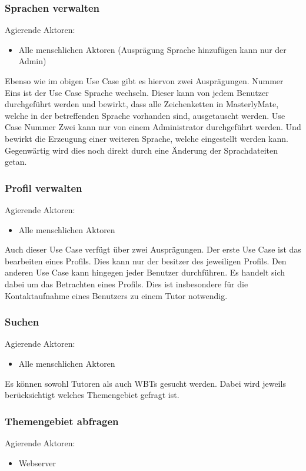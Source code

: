 \subsubsection{Sprachen verwalten}
Agierende Aktoren: \begin{itemize}
  \item Alle menschlichen Aktoren (Ausprägung Sprache
hinzufügen kann nur der Admin)
\end{itemize}

Ebenso wie im obigen Use Case gibt es hiervon zwei Ausprägungen.
Nummer Eins ist der Use Case Sprache wechseln. Dieser kann von jedem Benutzer
durchgeführt werden und bewirkt, dass alle Zeichenketten in MasterlyMate, welche
in der betreffenden Sprache vorhanden sind, ausgetauscht werden. Use Case Nummer
Zwei kann nur von einem Administrator durchgeführt werden. Und bewirkt die
Erzeugung einer weiteren Sprache, welche eingestellt werden kann. Gegenwärtig
wird dies noch direkt durch eine Änderung der Sprachdateiten getan.
\newpage
\subsubsection{Profil verwalten}
Agierende Aktoren: \begin{itemize}
  \item Alle menschlichen Aktoren
\end{itemize}

Auch dieser Use Case verfügt über zwei Ausprägungen. Der erste Use Case ist das
bearbeiten eines Profils. Dies kann nur der besitzer des jeweiligen Profils.
Den anderen Use Case kann hingegen jeder Benutzer durchführen. Es handelt sich
dabei um das Betrachten eines Profils. Dies ist insbesondere für die
Kontaktaufnahme eines Benutzers zu einem Tutor notwendig.

\subsubsection{Suchen}
Agierende Aktoren: \begin{itemize}
  \item Alle menschlichen Aktoren
\end{itemize}

Es können sowohl Tutoren als auch WBTs gesucht werden. Dabei wird jeweils
berücksichtigt welches Themengebiet gefragt ist.
	
\subsubsection{Themengebiet abfragen}
Agierende Aktoren: \begin{itemize}
  \item Webserver
\end{itemize}

